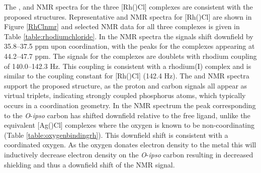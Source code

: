 The \proton{}, \carbon{} and \phosphorus{} NMR spectra for the three [Rh(\tBuxantphosk)Cl] complexes are consistent with the proposed structures.  Representative \proton{} and \phosphorus{} NMR spectra for [Rh(\tBuxantphos)Cl] are shown in Figure \ref{RhClnmr} and selected NMR data for all three complexes is given in Table \ref{table:rhodiumchloride}.  In the \phosphorus{} NMR spectra the signals shift downfield by 35.8--37.5 ppm upon coordination, with the peaks for the complexes appearing at 44.2--47.7 ppm.  The signals for the complexes are doublets with rhodium coupling of 140.0--142.3 Hz.  This coupling is consistent with a rhodium(I) complex and is similar to the coupling constant for [Rh(\iPrxantphosk)Cl] (142.4 Hz).\cite{Esteruelas2013}  The \proton{} and \carbon{} NMR spectra support the proposed structure, as the \tBu{} proton and carbon signals all appear as virtual triplets, indicating strongly coupled phosphorus atoms, which typically occurs in a \trans{} coordination geometry.\cite{Harris1964, Pregosin2012}  In the \carbon{} NMR spectrum the peak corresponding to the \emph{O}-\emph{ipso} carbon has shifted downfield relative to the free ligand, unlike the equivalent [Ag(\tBuxantphos)Cl] complexes where the oxygen is known to be non-coordinating (Table \ref{table:oxygenbindingrh}).  This downfield shift is consistent with a coordinated oxygen.  As the oxygen donates electron density to the metal this will inductively decrease electron density on the \emph{O}-\emph{ipso} carbon resulting in decreased shielding and thus a downfield shift of the NMR signal.  %

